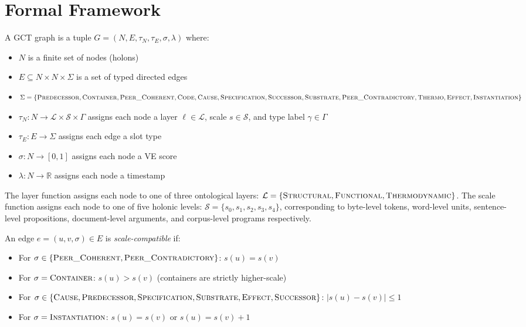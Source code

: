 \documentclass{iosart2x}
\begin{document}
\section{Formal Framework}
\label{sec:formal}

\begin{definition}
A GCT graph is a tuple $G = (N, E, \tau_N, \tau_E, \sigma, \lambda)$ where:
\begin{itemize}
  \item $N$ is a finite set of nodes (holons)
  \item $E \subseteq N \times N \times \Sigma$ is a set of typed directed edges
  \item $\Sigma = \{\textsc{Predecessor}, \textsc{Container}, \textsc{Peer\_Coherent}, \textsc{Code}, \textsc{Cause}, \textsc{Specification}, \textsc{Successor}, \textsc{Substrate}, \textsc{Peer\_Contradictory}, \textsc{Thermo}, \textsc{Effect}, \textsc{Instantiation}\}$
  \item $\tau_N : N \rightarrow \mathcal{L} \times \mathcal{S} \times \Gamma$ assigns each node a layer $\ell \in \mathcal{L}$, scale $s \in \mathcal{S}$, and type label $\gamma \in \Gamma$
  \item $\tau_E : E \rightarrow \Sigma$ assigns each edge a slot type
  \item $\sigma : N \rightarrow [0,1]$ assigns each node a VE score
  \item $\lambda : N \rightarrow \mathbb{R}$ assigns each node a timestamp
\end{itemize}
\end{definition}

The layer function assigns each node to one of three ontological layers: $\mathcal{L} = \{\textsc{Structural}, \textsc{Functional}, \textsc{Thermodynamic}\}$. The scale function assigns each node to one of five holonic levels: $\mathcal{S} = \{s_0, s_1, s_2, s_3, s_4\}$, corresponding to byte-level tokens, word-level units, sentence-level propositions, document-level arguments, and corpus-level programs respectively.

\begin{definition}
An edge $e = (u, v, \sigma) \in E$ is \emph{scale-compatible} if:
\begin{itemize}
  \item For $\sigma \in \{\textsc{Peer\_Coherent}, \textsc{Peer\_Contradictory}\}$: $s(u) = s(v)$
  \item For $\sigma = \textsc{Container}$: $s(u) > s(v)$ (containers are strictly higher-scale)
  \item For $\sigma \in \{\textsc{Cause}, \textsc{Predecessor}, \textsc{Specification}, \textsc{Substrate}, \textsc{Effect}, \textsc{Successor}\}$: $|s(u) - s(v)| \leq 1$
  \item For $\sigma = \textsc{Instantiation}$: $s(u) = s(v)$ or $s(u) = s(v) + 1$
\end{itemize}
\end{definition}
\end{document}
